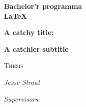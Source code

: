 \documentclass{scripts/preamble}
\begin{document}
\begin{titlepage}
	    \begin{flushright}
	    {\Large\bfseries Bachelor'r programma\\\LaTeX \par} %
	    \end{flushright}
		\vspace{0.3cm}
	    \begin{center}
	    {\LARGE\bfseries A catchy title:\par} %
	    {\Large\bfseries A catchier subtitle\par}
	    \end{center}
		\vspace{1cm}
	    {\scshape\Large Thesis\par}
		\vspace{0.5cm} %
		{\Large\itshape Jesse Straat\par} %
	    \vspace{0.5cm}
	    \centering
	    \vspace{0.5cm}
	    \par
	    \raggedleft
		{\Large\itshape Supervisors}:\par\vspace{0.25cm}%

\end{titlepage}
\end{document}

